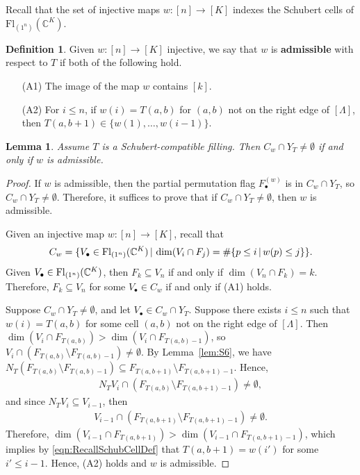 \documentclass[11pt]{amsart}
\newtheorem{lemma}[theorem]{Lemma}     %
\theoremstyle{definition}
\newtheorem{definition}[theorem]{Definition}
\newcommand{\st}{\,|\,}
\newcommand{\Fl}{\mathrm{Fl}}
\begin{document}
Recall that the set of injective maps $w:[n]\rightarrow [K]$ indexes the Schubert cells of $\Fl_{(1^n)}(\mathbb{C}^K)$.
\begin{definition}
Given $w:[n]\rightarrow[K]$ injective, we say that $w$ is {\bf admissible} with respect to $T$ if both of the following hold.
\begin{itemize}
    \item[(A1)] The image of the map $w$ contains $[k]$.
    \item[(A2)] For $i\leq n$, if $w(i)=T(a,b)$ for $(a,b)$ not on the right edge of $[\Lambda]$, then $T(a,b+1)\in \{w(1),\dots, w(i-1)\}$. 
\end{itemize}
\end{definition}

\begin{lemma}\label{lem:NonemptyIntersections}
Assume $T$ is a Schubert-compatible filling.  Then  $C_w\cap Y_{T}\neq\emptyset$ if and only if $w$ is admissible.
\end{lemma}



\begin{proof}
If $w$ is admissible, then the partial permutation flag $F^{(w)}_\bullet$ is in $C_w\cap Y_{T}$, so $C_w\cap Y_{T} \neq \emptyset$. Therefore, it suffices to prove that if $C_w\cap Y_{T}\neq\emptyset$, then $w$ is admissible.

Given an injective map $w: [n]\to [K]$, recall that 
\begin{align} \label{eqn:RecallSchubCellDef}
    C_w = \{V_\bullet \in \Fl_{(1^n)}(\bC^K) \st \dim(V_i\cap F_j) = \#\{p\leq i \st w(p)\leq j\}\}.
\end{align}
Given $V_\bullet\in \Fl_{(1^n)}(\bC^K)$, then $F_k\subseteq V_n$ if and only if $\dim(V_n\cap F_k) = k$. Therefore, $F_k\subseteq V_n$ for some $V_\bullet\in C_w$ if and only if (A1) holds.

Suppose $C_w\cap Y_{T}\neq\emptyset$, and let $V_\bullet \in C_w\cap Y_{T}$. Suppose there exists $i\leq n$ such that $w(i) = T(a,b)$ for some cell $(a,b)$ not on the right edge of $[\Lambda]$.
Then $\dim(V_i\cap F_{T(a,b)})>\dim(V_i\cap F_{T(a,b)-1})$, so $V_i\cap (F_{T(a,b)}\setminus F_{T(a,b)-1})\neq\emptyset$.  By Lemma~\ref{lem:S6}, we have $N_T (F_{T(a,b)}\setminus F_{T(a,b)-1}) \subseteq F_{T(a,b+1)}\setminus F_{T(a,b+1)-1}$. Hence,
\begin{align}
    N_T V_i \cap (F_{T(a,b)} \setminus F_{T(a,b+1)-1}) \neq \emptyset,
\end{align}
and since $N_T V_i\subseteq V_{i-1}$, then
\begin{align}
    V_{i-1} \cap (F_{T(a,b+1)}\setminus F_{T(a,b+1)-1}) \neq \emptyset.
\end{align}
Therefore, $\dim(V_{i-1}\cap F_{T(a,b+1)})>\dim(V_{i-1}\cap F_{T(a,b+1)-1})$, which implies by \eqref{eqn:RecallSchubCellDef} that $T(a,b+1)=w(i')$ for some $i'\leq i-1$. Hence, (A2) holds and $w$ is admissible.
\end{proof}
\end{document}
